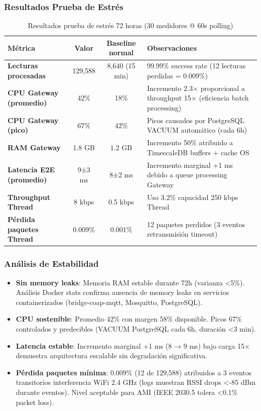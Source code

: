 \subsubsection{Resultados Prueba de Estrés}

\begin{table}[H]
\centering
\caption{Resultados prueba de estrés 72 horas (30 medidores @ 60s polling)}
\label{tab:stress-test-72h}
\begin{tabular}{|l|c|c|p{5cm}|}
\hline
\rowcolor{gray!20}
\textbf{Métrica} & \textbf{Valor} & \textbf{Baseline normal} & \textbf{Observaciones} \\
\hline
\textbf{Lecturas procesadas} & 129,588 & 8,640 (15 min) & 99.99\% success rate (12 lecturas perdidas = 0.009\%) \\
\hline
\textbf{CPU Gateway (promedio)} & 42\% & 18\% & Incremento 2.3$\times$ proporcional a throughput 15$\times$ (eficiencia batch processing) \\
\hline
\textbf{CPU Gateway (pico)} & 67\% & 42\% & Picos causados por PostgreSQL VACUUM automático (cada 6h) \\
\hline
\textbf{RAM Gateway} & 1.8 GB & 1.2 GB & Incremento 50\% atribuido a TimescaleDB buffers + cache OS \\
\hline
\textbf{Latencia E2E (promedio)} & 9±3 ms & 8±2 ms & Incremento marginal +1 ms debido a queue processing Gateway \\
\hline
\textbf{Throughput Thread} & 8 kbps & 0.5 kbps & Uso 3.2\% capacidad 250 kbps Thread \\
\hline
\textbf{Pérdida paquetes Thread} & 0.009\% & 0.001\% & 12 paquetes perdidos (3 eventos retransmisión timeout) \\
\hline
\end{tabular}
\end{table}

\subsubsection{Análisis de Estabilidad}

\begin{itemize}
    \item \textbf{Sin memory leaks}: Memoria RAM estable durante 72h (varianza <5\%). Análisis Docker stats confirma ausencia de memory leaks en servicios containerizados (bridge-coap-mqtt, Mosquitto, PostgreSQL).
    
    \item \textbf{CPU sostenible}: Promedio 42\% con margen 58\% disponible. Picos 67\% controlados y predecibles (VACUUM PostgreSQL cada 6h, duración <3 min).
    
    \item \textbf{Latencia estable}: Incremento marginal +1 ms (8 → 9 ms) bajo carga 15$\times$ demuestra arquitectura escalable sin degradación significativa.
    
    \item \textbf{Pérdida paquetes mínima}: 0.009\% (12 de 129,588) atribuidos a 3 eventos transitorios interferencia WiFi 2.4 GHz (logs muestran RSSI drops <-85 dBm durante eventos). Nivel aceptable para AMI (IEEE 2030.5 tolera <0.1\% packet loss).
\end{itemize}


